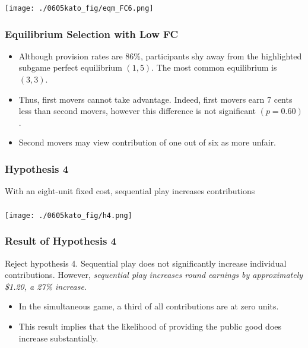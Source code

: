 \documentclass[unicode,12pt]{beamer}
\begin{document}
    \begin{frame}
        \frametitle{}
    
        \centerline{\texttt{[image: ./0605kato\_fig/eqm\_FC6.png]}}        
    
    \end{frame}

    \begin{frame}
        \frametitle{Equilibrium Selection with Low FC}
    
        \begin{itemize}
            \item Although provision rates are 86\%, participants shy away from the highlighted subgame perfect equilibrium $(1,5)$. The most common equilibrium is $(3,3)$.
            \item Thus, first movers cannot take advantage. Indeed, first movers earn 7 cents less than second movers, however this difference is not significant $(p = 0.60)$.
            \item Second movers may view contribution of one out of six as more unfair.
        \end{itemize}
    
    \end{frame}

    \begin{frame}
        \frametitle{Hypothesis 4}
    
        With an eight-unit fixed cost, sequential play increases contributions
    
    \end{frame}

    \begin{frame}
        \frametitle{}
    
        \centerline{\texttt{[image: ./0605kato\_fig/h4.png]}}
    
    \end{frame}


    \begin{frame}
        \frametitle{Result of Hypothesis 4}
    
        Reject hypothesis 4. Sequential play does not significantly increase individual contributions.
        However, \textit{sequential play increases round earnings by approximately \$1.20, a 27\% increase}.
        \begin{itemize}
            \item In the simultaneous game, a third of all contributions are at zero units.
            \item This result implies that the likelihood of providing the public good does increase substantially.
        \end{itemize}
    
    \end{frame}
\end{document}
